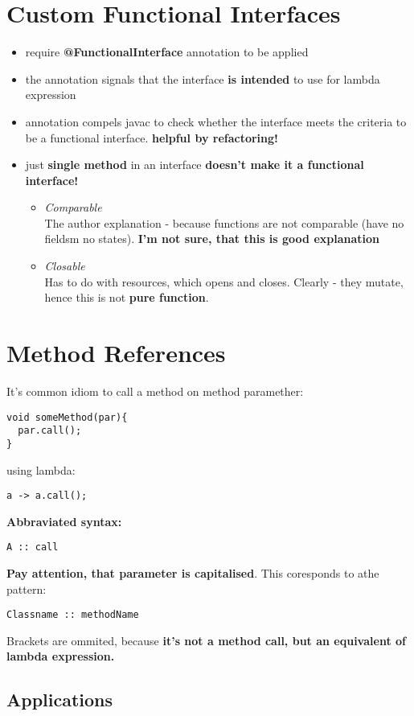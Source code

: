 \documentclass{report}
\begin{document}
\section{Custom Functional Interfaces}
\begin{itemize}
	\item require \textbf{@FunctionalInterface} annotation to be applied
	\item  the annotation signals that the interface \textbf{is intended} to use for lambda expression
	\item annotation compels javac to check whether the interface meets the criteria to be a functional interface. \textbf{helpful by refactoring!}
	\item just \textbf{single method} in an interface \textbf{doesn't make it a functional interface!}
	\begin{itemize}
		\item \textit{Comparable}\\
		The author explanation - because functions are not comparable (have no fieldsm no states). \textbf{I'm not sure, that this is good explanation}
		\item \textit{Closable}\\
		Has to do with resources, which opens and closes. Clearly - they mutate, hence this is not \textbf{pure function}.
	\end{itemize}
\end{itemize}

\section{Method References}
It's common idiom to call a method on method paramether:
\begin{verbatim}
void someMethod(par){
  par.call();
}
\end{verbatim}
using lambda:
\begin{verbatim}
a -> a.call();
\end{verbatim}

\textbf{Abbraviated syntax:}
\begin{verbatim}
A :: call
\end{verbatim}
\textbf{Pay attention, that parameter is capitalised}. This coresponds to athe pattern:
\begin{verbatim}
Classname :: methodName
\end{verbatim}
Brackets are ommited, because \textbf{it's not a method call, but an equivalent of lambda expression.}
\subsection{Applications}
\end{document}
